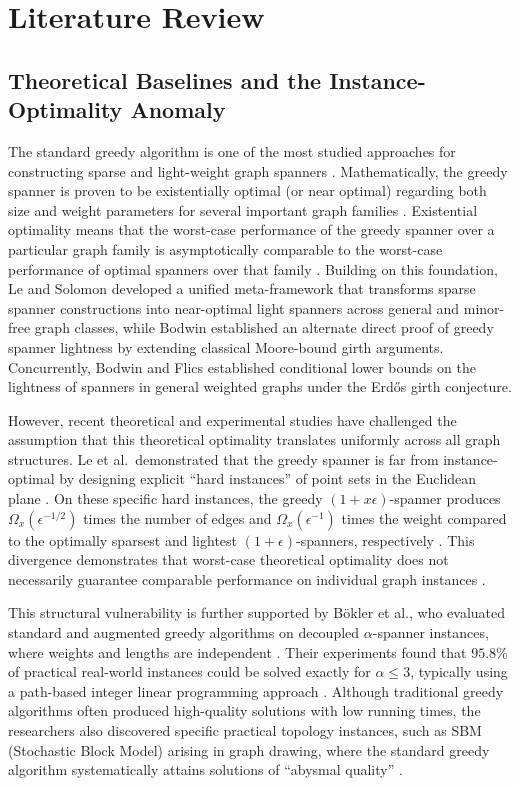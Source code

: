 \documentclass[conference]{IEEEtran}
\begin{document}
\section{Literature Review}

\subsection{Theoretical Baselines and the Instance-Optimality Anomaly}
The standard greedy algorithm is one of the most studied approaches for constructing sparse and light-weight graph spanners \cite{ref4}. Mathematically, the greedy spanner is proven to be existentially optimal (or near optimal) regarding both size and weight parameters for several important graph families \cite{ref5}. Existential optimality means that the worst-case performance of the greedy spanner over a particular graph family is asymptotically comparable to the worst-case performance of optimal spanners over that family \cite{ref5}. Building on this foundation, Le and Solomon \cite{ref18} developed a unified meta-framework that transforms sparse spanner constructions into near-optimal light spanners across general and minor-free graph classes, while Bodwin \cite{ref17} established an alternate direct proof of greedy spanner lightness by extending classical Moore-bound girth arguments. Concurrently, Bodwin and Flics \cite{ref19} established conditional lower bounds on the lightness of spanners in general weighted graphs under the Erd\H{o}s girth conjecture.

However, recent theoretical and experimental studies have challenged the assumption that this theoretical optimality translates uniformly across all graph structures. Le et al.\ demonstrated that the greedy spanner is far from instance-optimal by designing explicit ``hard instances'' of point sets in the Euclidean plane \cite{ref7}. On these specific hard instances, the greedy $(1 + x\epsilon)$-spanner produces $\Omega_x(\epsilon^{-1/2})$ times the number of edges and $\Omega_x(\epsilon^{-1})$ times the weight compared to the optimally sparsest and lightest $(1+\epsilon)$-spanners, respectively \cite{ref7}. This divergence demonstrates that worst-case theoretical optimality does not necessarily guarantee comparable performance on individual graph instances \cite{ref7}.

This structural vulnerability is further supported by B\"{o}kler et al., who evaluated standard and augmented greedy algorithms on decoupled $\alpha$-spanner instances, where weights and lengths are independent \cite{ref6}. Their experiments found that $95.8\%$ of practical real-world instances could be solved exactly for $\alpha \le 3$, typically using a path-based integer linear programming approach \cite{ref6}. Although traditional greedy algorithms often produced high-quality solutions with low running times, the researchers also discovered specific practical topology instances, such as SBM (Stochastic Block Model) arising in graph drawing, where the standard greedy algorithm systematically attains solutions of ``abysmal quality'' \cite{ref6}.
\end{document}
